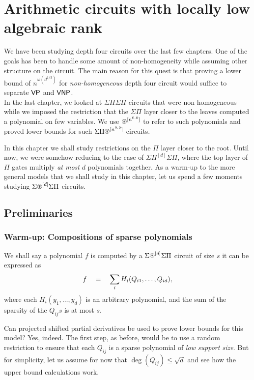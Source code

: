 \chapter{Arithmetic circuits with locally low algebraic rank}
\label{chap:lowAlgRank}

We have been studying depth four circuits over the last few chapters. One of the goals has been to handle some amount of non-homogeneity while assuming other structure on the circuit. The main reason for this quest is that proving a lower bound of $n^{\omega(d^{1/3})}$ for \emph{non-homogeneous} depth four circuit would suffice to separate $\mathsf{VP}$ and $\mathsf{VNP}$. \\

In the last chapter, we looked at $\Sigma\Pi\Sigma\Pi$ circuits that were non-homogeneous while we imposed the restriction that the $\Sigma\Pi$ layer closer to the leaves computed a polynomial on few variables. We use $\circast^{[n^{0.9}]}$ to refer to such polynomials and proved lower bounds for such $\SPA^{[n^{0.9}]}$ circuits. 

In this chapter we shall study restrictions on the $\Pi$ layer closer to the root. Until now, we were somehow reducing to the case of $\Sigma\Pi^{[d]}\Sigma\Pi$, where the top layer of $\Pi$ gates multiply \emph{at most} $d$ polynomials together. As a warm-up to the more general models that we shall study in this chapter, let us spend a few moments studying $\Sigma\circast^{[d]}\Sigma\Pi$ circuits. 

\section{Preliminaries}

\subsection{Warm-up: Compositions of sparse polynomials}\label{sec:low-algrank-warmup}

\begin{definition}
We shall say a polynomial $f$ is computed by a $\Sigma\circast^{[d]}\Sigma\Pi$ circuit of size $s$ it can be expressed as
\[
f \quad = \quad \sum_i H_i(Q_{i1},\ldots, Q_{id}),
\]
where each $H_i(y_1,\ldots, y_d)$ is an arbitrary polynomial, and the sum of the sparsity of the $Q_{ij}s$ is at most $s$. 
\end{definition}

Can projected shifted partial derivatives be used to prove lower bounds for this model? Yes, indeed. The first step, as before, would be to use a random restriction to ensure that each $Q_{ij}$ is a sparse polynomial of \emph{low support size}. But for simplicity, let us assume for now that $\deg(Q_{ij})\leq \sqrt{d}$ and see how the upper bound calculations work. 

